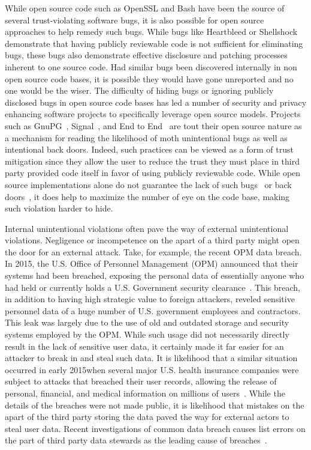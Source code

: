 While open source code such as OpenSSL and Bash have been the source
of several trust-violating software bugs, it is also possible for open
source approaches to help remedy such bugs. While bugs like Heartbleed
or Shellshock demonstrate that having publicly reviewable code is not
sufficient for eliminating bugs, these bugs also demonstrate effective
disclosure and patching processes inherent to one source code. Had
similar bugs been discovered internally in non open source code bases,
it is possible they would have gone unreported and no one would be the
wiser. The difficulty of hiding bugs or ignoring publicly disclosed
bugs in open source code bases has led a number of security and
privacy enhancing software projects to specifically leverage open
source models. Projects such as GnuPG~\cite{gnupg},
Signal~\cite{openwhisper}, and End to End~\cite{google-endtoend,
  yahoo-endtoend} are tout their open source nature as a mechanism for
reading the likelihood of moth unintentional bugs as well as
intentional back doors. Indeed, such practices can be viewed as a form
of trust mitigation since they allow the user to reduce the trust they
must place in third party provided code itself in favor of using
publicly reviewable code. While open source implementations alone do
not guarantee the lack of such bugs~\cite{frosch2014} or
back doors~\cite{thompson1984}, it does help to maximize the number of
eye on the code base, making such violation harder to hide.

Internal unintentional violations often pave the way of external
unintentional violations. Negligence or incompetence on the apart of a
third party might open the door for an external attack. Take, for
example, the recent OPM data breach. In 2015, the U.S. Office of
Personnel Management (OPM) announced that their systems had been
breached, exposing the personal data of essentially anyone who had
held or currently holds a U.S. Government security
clearance~\cite{ars-opmhack, opm-cybersecurityincidents}. This breach,
in addition to having high strategic value to foreign attackers,
reveled sensitive personnel data of a huge number of U.S.  government
employees and contractors. This leak was largely due to the use of old
and outdated storage and security systems employed by the OPM. While
such usage did not necessarily directly result in the lack of
sensitive user data, it certainly made it far easier for an attacker
to break in and steal such data. It is likelihood that a similar
situation occurred in early 2015when several major U.S. health
insurance companies were subject to attacks that breached their user
records, allowing the release of personal, financial, and medical
information on millions of users~\cite{krebs-anthem,
  krebs-premera}. While the details of the breaches were not made
public, it is likelihood that mistakes on the apart of the third party
storing the data paved the way for external actors to steal user
data. Recent investigations of common data breach causes list errors
on the part of third party data stewards as the leading cause of
breaches~\cite{verizon-2016breach, gallagher-blame}.

